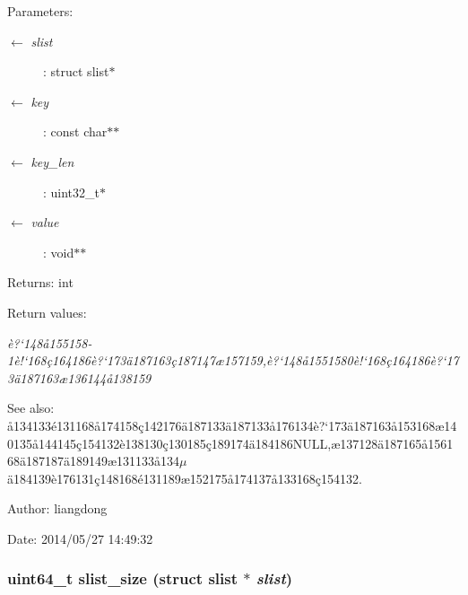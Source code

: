 \begin{Desc}
\item[Parameters:]
\begin{description}
\item[\mbox{$\leftarrow$} {\em slist}]: struct slist$\ast$ \item[\mbox{$\leftarrow$} {\em key}]: const char$\ast$$\ast$ \item[\mbox{$\leftarrow$} {\em key\_\-len}]: uint32\_\-t$\ast$ \item[\mbox{$\leftarrow$} {\em value}]: void$\ast$$\ast$ \end{description}
\end{Desc}
\begin{Desc}
\item[Returns:]int \end{Desc}
\begin{Desc}
\item[Return values:]
\begin{description}
\item[{\em \`{e}?`148\aa{}155158-1\`{e}!`168\c{c}164186\`{e}?`173\"{a}187163\c{c}187147\ae{}157159,\`{e}?`148\aa{}1551580\`{e}!`168\c{c}164186\`{e}?`173\"{a}187163\ae{}136144\aa{}138159}]\end{description}
\end{Desc}
\begin{Desc}
\item[See also:]\aa{}134133\'{e}131168\aa{}174158\c{c}142176\"{a}187133\"{a}187133\aa{}176134\`{e}?`173\"{a}187163\aa{}153168\ae{}140135\aa{}144145\c{c}154132\`{e}138130\c{c}130185\c{c}189174\"{a}184186NULL,\ae{}137128\"{a}187165\aa{}156168\"{a}187187\"{a}189149\ae{}131133\aa{}134$\mu$\"{a}184139\`{e}176131\c{c}148168\'{e}131189\ae{}152175\aa{}174137\aa{}133168\c{c}154132. \end{Desc}
\begin{Desc}
\item[Author:]liangdong \end{Desc}
\begin{Desc}
\item[Date:]2014/05/27 14:49:32 \end{Desc}
\subsubsection{\setlength{\rightskip}{0pt plus 5cm}uint64\_\-t slist\_\-size (struct slist $\ast$ {\em slist})}\label{slist_8c_a16}


